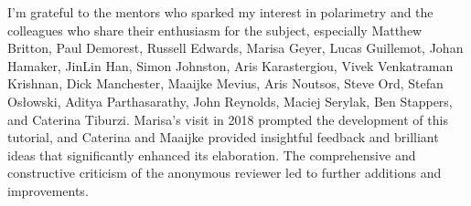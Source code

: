 \documentclass[twocolumn,twocolappendix]{aastex701}
\begin{document}


%




%




%



%



%

%

\begin{acknowledgments}

I'm grateful to the mentors who sparked my interest in polarimetry and the colleagues who share their enthusiasm for the subject, especially \nohyphens{Matthew Britton, Paul Demorest, Russell Edwards, Marisa Geyer, Lucas Guillemot, Johan Hamaker, JinLin Han, Simon Johnston, Aris Karastergiou, Vivek Venkatraman Krishnan, Dick Manchester, Maaijke Mevius, Aris Noutsos, Steve Ord, Stefan Os{\l}owski, Aditya Parthasarathy, John Reynolds, Maciej Serylak, Ben Stappers, and Caterina Tiburzi}.  Marisa's visit in 2018 prompted the development of this tutorial, and Caterina and Maaijke provided insightful feedback and brilliant ideas that significantly enhanced its elaboration.
%
The comprehensive and constructive criticism of the anonymous reviewer led to further additions and improvements.

\end{acknowledgments}
\end{document}
